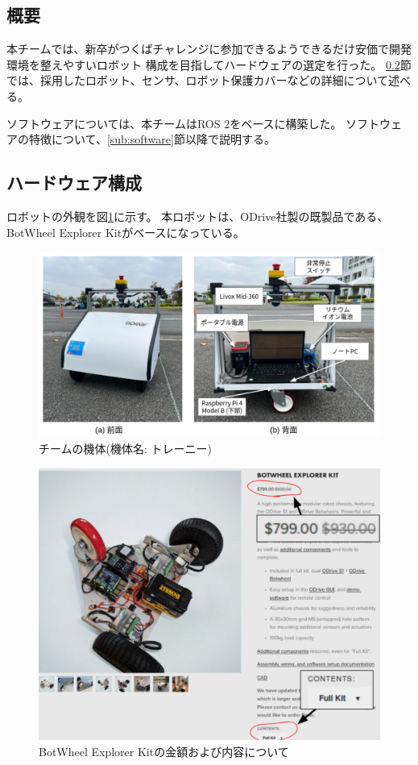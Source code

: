 \documentclass[twocolumn,9pt]{jsproceedings}
\begin{document}
\subsection{概要}
本チームでは、新卒がつくばチャレンジに参加できるようできるだけ安価で開発環境を整えやすいロボット
構成を目指してハードウェアの選定を行った。
\ref{sub:hardware}節では、採用したロボット、センサ、ロボット保護カバーなどの詳細について述べる。

ソフトウェアについては、本チームはROS 2\cite{ROS 2}をベースに構築した。
ソフトウェアの特徴について、\ref{sub:software}節以降で説明する。


\subsection{ハードウェア構成}\label{sub:hardware}
ロボットの外観を図\ref{fig:trainee}に示す。
本ロボットは、ODrive社製の既製品である、BotWheel Explorer Kit\cite{RTshop}がベースになっている。

\begin{figure}[h]
  \begin{center}
    \includegraphics[width=1.0\linewidth]{figs/trainee.pdf}
    \caption{チームの機体(機体名: トレーニー)}
    \label{fig:trainee}
  \end{center}
\end{figure}

\begin{figure}[h]
  \begin{center}
    \includegraphics[width=0.8\linewidth]{figs/b_kit_price.pdf}
    \caption{BotWheel Explorer Kitの金額および内容について}
    \label{fig:b_robot_price}
  \end{center}
\end{figure}
\end{document}
